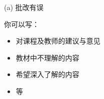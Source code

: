 \documentclass[11pt, a4paper, UTF8]{ctexart}
\begin{document}
\begin{revision}
(a) 批改有误
\end{revision}







\beginfb	%

你可以写：
\begin{itemize}
  \item 对课程及教师的建议与意见
  \item 教材中不理解的内容
  \item 希望深入了解的内容
  \item 等
\end{itemize}
\end{document}
